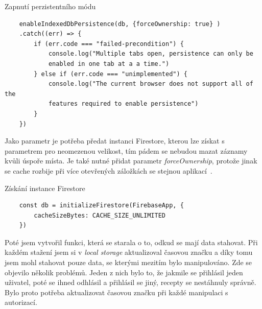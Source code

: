 \begin{listing}[h]
    \caption{Zapnutí perzistentního módu}
    \begin{verbatim}
    enableIndexedDbPersistence(db, {forceOwnership: true} )
    .catch((err) => {
        if (err.code === "failed-precondition") {
            console.log("Multiple tabs open, persistence can only be
            enabled in one tab at a a time.")
        } else if (err.code === "unimplemented") {
            console.log("The current browser does not support all of the
            features required to enable persistence")
        }
    })
    \end{verbatim}
\end{listing}

Jako parametr je potřeba předat instanci Firestore, kterou lze získat s parametrem pro neomezenou velikost, tím pádem se nebudou
mazat záznamy kvůli úspoře místa. Je také nutné přidat parametr \emph{forceOwnership}, protože jinak se cache rozbije při více
otevřených záložkách se stejnou aplikací~\cite{FirebaseMultipleTabs}.

\begin{listing}[h]
    \caption{Získání instance Firestore}
    \begin{verbatim}
    const db = initializeFirestore(FirebaseApp, {
        cacheSizeBytes: CACHE_SIZE_UNLIMITED
    })
    \end{verbatim}
\end{listing}

Poté jsem vytvořil funkci, která se starala o to, odkud se mají data stahovat. Při každém stažení jsem si v \emph{local storage} aktualizoval
časovou značku a díky tomu jsem mohl stahovat pouze data, se kterými mezitím bylo manipulováno. Zde se objevilo několik problémů. Jeden z nich
bylo to, že jakmile se přihlásil jeden uživatel, poté se ihned odhlásil a přihlásil se jiný, recepty se nestáhnuly správně. Bylo proto potřeba
aktualizovat časovou značku při každé manipulaci s autorizací.

